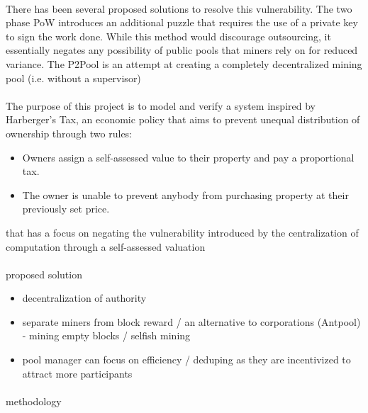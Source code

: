 \paragraph{} There has been several proposed solutions to resolve this vulnerability. The two phase PoW \cite{bastiaan2015} introduces an additional puzzle that requires the use of a private key to sign the work done. While this method would discourage outsourcing, it essentially negates any possibility of public pools that miners rely on for reduced variance. The P2Pool is an attempt at creating a completely decentralized mining pool (i.e. without a supervisor) 

\paragraph{} The purpose of this project is to model and verify a system inspired by Harberger's Tax,  an economic policy that aims to prevent unequal distribution of ownership through two rules:

\begin{itemize}
  \item Owners assign a self-assessed value to their property and pay a proportional tax.
  \item The owner is unable to prevent anybody from purchasing property at their previously set price.
\end{itemize}

that has a focus on negating the vulnerability introduced by the centralization of computation through a self-assessed valuation 

\paragraph{} proposed solution

\begin{itemize}
  \item decentralization of authority
  \item separate miners from block reward / an alternative to corporations (Antpool) - mining empty blocks / selfish mining
  \item pool manager can focus on efficiency / deduping as they are incentivized to attract more participants
\end{itemize}

\paragraph{} methodology


